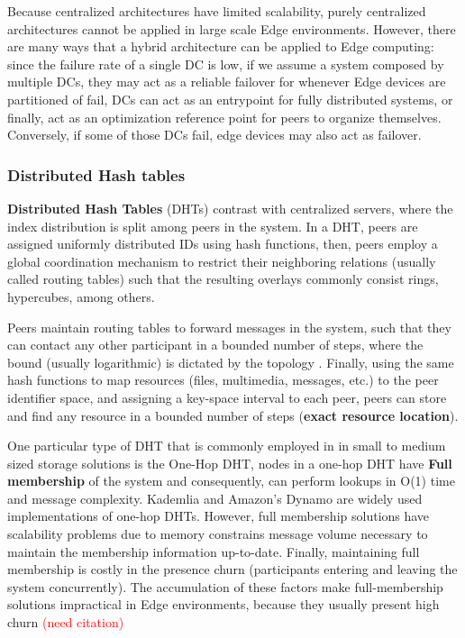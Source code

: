 Because centralized architectures have limited scalability, purely centralized architectures cannot be applied in large scale Edge environments. However, there are many ways that a hybrid architecture can be applied to Edge computing: since the failure rate of a single DC is low, if we assume a system composed by multiple DCs, they may act as a reliable failover for whenever Edge devices are partitioned of fail, DCs can act as an entrypoint for fully distributed systems, or finally, act as an optimization reference point for peers to organize themselves. Conversely, if some of those DCs fail, edge devices may also act as failover.


\subsubsection{Distributed Hash tables}

\textbf{Distributed Hash Tables} (DHTs) contrast with centralized servers, where the index distribution is split among peers in the system. In a DHT, peers are assigned uniformly distributed IDs using hash functions, then, peers employ a global coordination mechanism to restrict their neighboring relations (usually called routing tables) such that the resulting overlays commonly consist rings, hypercubes, among others.

Peers maintain routing tables to forward messages in the system, such that they can contact any other participant in a bounded number of steps, where the bound (usually logarithmic) is dictated by the topology . Finally, using the same hash functions to map resources (files, multimedia, messages, etc.) to the peer identifier space, and assigning a key-space interval to each peer, peers can store and find any resource in a bounded number of steps (\textbf{exact resource location}).

One particular type of DHT that is commonly employed in in small to medium sized storage solutions is the One-Hop DHT, nodes in a one-hop DHT have \textbf{Full membership} of the system and consequently, can perform lookups in O(1) time and message complexity. Kademlia \cite{10.1007/3-540-45748-8_5} and Amazon's Dynamo \cite{decandia2007dynamo} are widely used implementations of one-hop DHTs.  However, full membership solutions have scalability problems due to memory constrains message volume necessary to maintain the membership information up-to-date. Finally, maintaining full membership is costly in the presence churn (participants entering and leaving the system concurrently). The accumulation of these factors make full-membership solutions impractical in Edge environments, because they usually present high churn \textcolor{red}{(need citation)}

